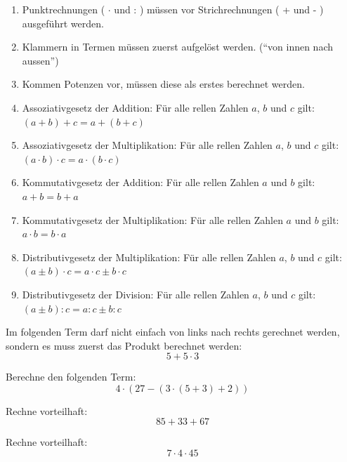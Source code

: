 \begin{tcolorbox}[colback=red!10!white,colframe=red!70!black,title=Rechengesetze,width=.9\linewidth]
	\begin{enumerate}
		\item
			Punktrechnungen ( $\cdot$ und : ) müssen vor Strichrechnungen ( + und - ) ausgeführt werden.
		\item
			Klammern in Termen müssen zuerst aufgelöst werden. ("`von innen nach aussen"')
		\item
			Kommen Potenzen vor, müssen diese als erstes berechnet werden.
		\item
			Assoziativgesetz der Addition: Für alle rellen Zahlen $a$, $b$ und $c$ gilt: $(a+b)+c = a+(b+c)$
		\item
			Assoziativgesetz der Multiplikation: Für alle rellen Zahlen $a$, $b$ und $c$ gilt: $(a\cdot b)\cdot c = a\cdot (b\cdot c)$
		\item
			Kommutativgesetz der Addition: Für alle rellen Zahlen $a$ und $b$ gilt: $a+ b= b+ a$
		\item
			Kommutativgesetz der Multiplikation: Für alle rellen Zahlen $a$ und $b$ gilt:$a\cdot b= b\cdot a$
		\item
			Distributivgesetz der Multiplikation: Für alle rellen Zahlen $a$, $b$ und $c$ gilt: $(a\pm b)\cdot c = a\cdot c \pm b\cdot c$
		\item
			Distributivgesetz der Division: Für alle rellen Zahlen $a$, $b$ und $c$ gilt: $(a\pm b): c = a: c \pm b: c$	
	\end{enumerate}
		
\end{tcolorbox}

\begin{example}
Im folgenden Term darf nicht einfach von links nach rechts gerechnet werden, sondern es muss zuerst das Produkt berechnet werden:
\[
	5+5\cdot 3
\]
\end{example}

\begin{example}
Berechne den folgenden Term:
\[
	4\cdot(27-(3\cdot (5+3)+2))
\]
\end{example}

\begin{example}
Rechne vorteilhaft:
\[
	85+33+67
\]
\end{example}

\begin{example}
Rechne vorteilhaft:
\[
	7\cdot 4 \cdot 45
\]
\end{example}

